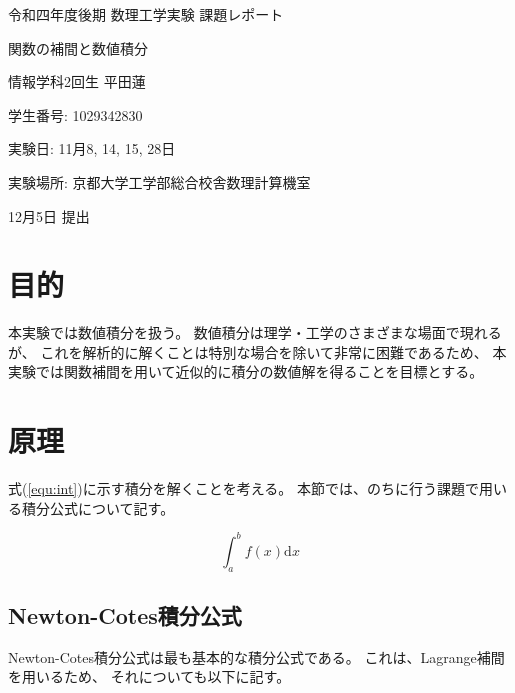 \documentclass[a4j, titlepage]{jsarticle}
\numberwithin{equation}{section}
\begin{document}
\begin{titlepage}
    \begin{center}
        {\Large 令和四年度後期 数理工学実験 課題レポート}

        \vspace*{180truept}

        {\Huge 関数の補間と数値積分}

        \vspace{160truept}

        {\Large 情報学科2回生 平田蓮}

        \vspace{10truept}

        {\large 学生番号: 1029342830}

        \vspace{60truept}

        {\large 実験日: 11月8, 14, 15, 28日}

        \vspace{10truept}

        {\large 実験場所: 京都大学工学部総合校舎数理計算機室}

        \vspace{60truept}

        {\large 12月5日 提出}
    \end{center}
\end{titlepage}

\tableofcontents
\clearpage

\section{目的}
    本実験では数値積分を扱う。
    数値積分は理学・工学のさまざまな場面で現れるが、
    これを解析的に解くことは特別な場合を除いて非常に困難であるため、
    本実験では関数補間を用いて近似的に積分の数値解を得ることを目標とする。

\section{原理}
    式(\ref{equ:int})に示す積分を解くことを考える。
    本節では、のちに行う課題で用いる積分公式について記す。

    \begin{equation}
        \int_a^bf(x)\mathrm{d}x \label{equ:int}
    \end{equation}

    \subsection{Newton-Cotes積分公式}
        Newton-Cotes積分公式は最も基本的な積分公式である。
        これは、Lagrange補間を用いるため、
        それについても以下に記す。
\end{document}
